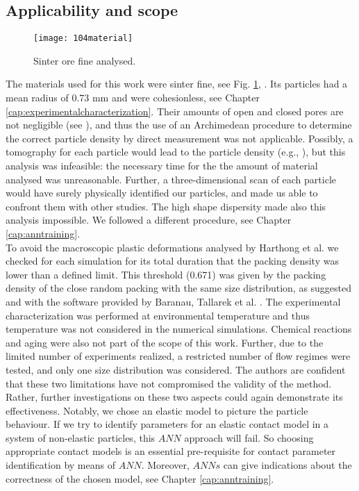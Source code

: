 


\subsection{Applicability and scope}
\label{subsec:applicability}

\begin{figure}[!htb] 
\centering 
\texttt{[image: 104material]} 
\caption[Sinter ore fine]{Sinter ore fine analysed.}
\label{fig:104material} 
\end{figure}


The materials used for this work were sinter fine, see Fig.
\ref{fig:104material}, 
. Its particles had a mean radius of 0.73 mm and were
cohesionless, see Chapter \ref{cap:experimentalcharacterization}.
Their amounts of open and closed pores are not negligible (see
\citet{RefWorks:191}), 
and thus the use of an Archimedean procedure to determine the correct particle density by direct measurement
was not applicable.
Possibly, a tomography for each particle would lead to the particle density
(e.g., \citet{RefWorks:77}), but this analysis was infeasible: 
the necessary time for the the amount of material
analysed was unreasonable. 
Further, a three-dimensional scan of each particle would have surely physically
identified our particles, and made us able to confront them with other studies. 
The high shape dispersity made also this analysis impossible. 
We followed a different procedure, see Chapter \ref{cap:anntraining}.\\
To avoid the macroscopic plastic deformations analysed by Harthong et al. \cite{RefWorks:183} 
we checked for each simulation for its total duration that the packing density was 
lower than a defined limit. 
This threshold (0.671) was given by the packing density of the close random packing with the 
same size distribution, as suggested and with the software provided by Baranau, Tallarek 
et al. \cite{RefWorks:182, RefWorks:185}.
The experimental characterization was performed at environmental temperature and thus 
temperature was not considered in the numerical simulations. Chemical reactions and aging 
were also not part of the scope of this work.
Further, due to the limited number of experiments realized, a restricted number
of flow regimes were tested, and only one size distribution was considered. 
The authors are confident that these two limitations have not compromised the validity of the method. 
Rather, further investigations on these two aspects could again demonstrate its effectiveness. 
Notably, we chose an elastic model to picture the particle behaviour. If we try
to identify parameters for an elastic contact model in a system of non-elastic particles, this $ANN$ approach will fail. 
So choosing appropriate contact models is an essential pre-requisite for contact 
parameter identification by means of $ANN$. 
Moreover, $ANNs$ can give indications about the correctness of the chosen model, 
see Chapter \ref{cap:anntraining}.